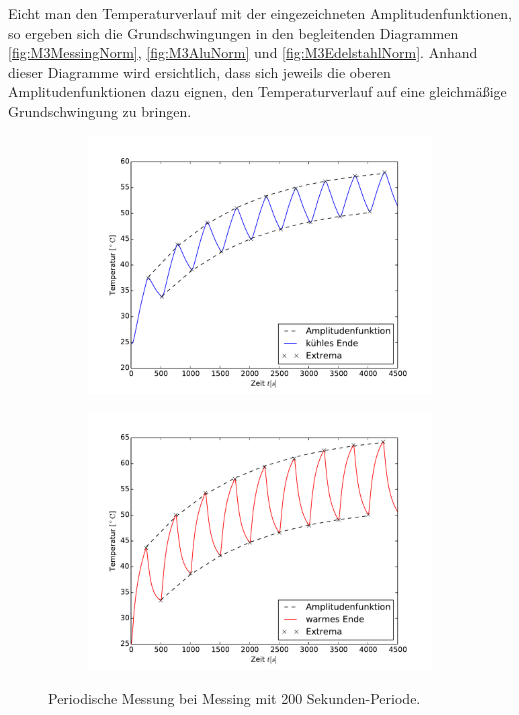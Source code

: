 Eicht man den Temperaturverlauf mit der eingezeichneten Amplitudenfunktionen, so ergeben sich die Grundschwingungen in den begleitenden Diagrammen \ref{fig:M3MessingNorm}, \ref{fig:M3AluNorm} und \ref{fig:M3EdelstahlNorm}. 
Anhand dieser Diagramme wird ersichtlich, dass sich jeweils die oberen Amplitudenfunktionen dazu eignen, den Temperaturverlauf auf eine gleichmäßige Grundschwingung zu bringen.
\begin{figure}[h]
	\label{fig:M3Messing}
	\centering
	\begin{subfigure}{0.9\textwidth}
	\includegraphics[width=\textwidth]{Bilder/M3_Messing_kuehl.pdf}
	\end{subfigure}
	\begin{subfigure}{0.9\textwidth}
	\includegraphics[width=\textwidth]{Bilder/M3_Messing_warm.pdf}
	\end{subfigure}
	\caption{Periodische Messung bei Messing mit 200 Sekunden-Periode.}
\label{fig:M3Messing}
\end{figure}
